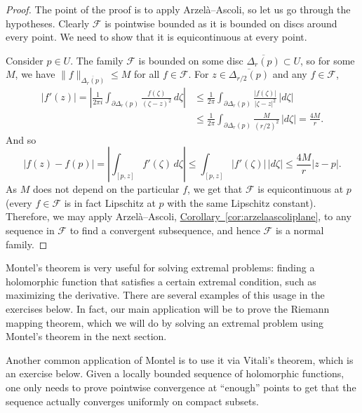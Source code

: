 \documentclass[12pt,openany]{book}
\newcommand{\sabs}[1]{\lvert {#1} \rvert}
\newcommand{\snorm}[1]{\lVert {#1} \rVert}
\newcommand{\abs}[1]{\left\lvert {#1} \right\rvert}
\newcommand{\sF}{{\mathscr{F}}}
\newcommand{\myquote}[1]{``#1''}
\theoremstyle{plain}
\theoremstyle{remark}
\theoremstyle{definition}
\theoremstyle{exercise}
\theoremstyle{example}
\newcommand{\corref}[1]{\hyperref[#1]{Corollary~\ref*{#1}}}
\begin{document}
\begin{proof}
The point of the proof is to apply Arzel\`a--Ascoli, so let us go through
the hypotheses.
Clearly $\sF$ is pointwise bounded as it is bounded on discs around
every point.
We need to show that it is equicontinuous at every point.

Consider $p \in U$.
The family
$\sF$ is bounded on some disc $\overline{\Delta_r(p)} \subset U$,
so for some $M$, we have
$\snorm{f}_{\overline{\Delta_r(p)}} \leq M$ for all $f \in \sF$.
For $z \in \overline{\Delta_{r/2}(p)}$ and any $f \in \sF$,
\begin{equation*}
\begin{split}
\abs{f'(z)}
=
\abs{
\frac{1}{2\pi i}
\int_{\partial \Delta_r(p)}
\frac{f(\zeta)}{{(\zeta-z)}^2} \, d\zeta
}
& \leq
\frac{1}{2\pi}
\int_{\partial \Delta_r(p)}
\frac{\sabs{f(\zeta)}}{\sabs{\zeta-z}^2} \, \sabs{d\zeta}
\\
& \leq
\frac{1}{2\pi}
\int_{\partial \Delta_r(p)}
\frac{M}{{(r/2)}^2} \, \sabs{d\zeta}
=
\frac{4 M}{r}.
\end{split}
\end{equation*}
And so
\begin{equation*}
\abs{f(z)-f(p)}
=
\abs{
\int_{[p,z]} f'(\zeta) \, d\zeta
}
\leq
\int_{[p,z]} \abs{f'(\zeta)} \, \sabs{d\zeta}
\leq
\frac{4 M}{r} \sabs{z-p} .
\end{equation*}
As $M$ does not depend on the particular $f$, we get that $\sF$ is
equicontinuous at $p$ (every $f \in \sF$ is in fact Lipschitz at $p$ with the same
Lipschitz constant).
Therefore, we may apply Arzel\`a--Ascoli, 
\corref{cor:arzelaascoliplane}, to any sequence in $\sF$
to find a convergent subsequence, and hence $\sF$ is a normal family.
\end{proof}

Montel's theorem is very useful for solving extremal problems: 
finding a holomorphic function that satisfies a certain extremal condition,
such as maximizing the derivative.  There are several examples of this
usage in the exercises below.  In fact, our main application will be to
prove the Riemann mapping theorem,
which we will do by solving an extremal
problem using Montel's theorem in the next section.

Another common application of Montel is to use it via Vitali's theorem, which is
an exercise below.  Given a locally bounded sequence of holomorphic
functions, one only needs to prove pointwise convergence at \myquote{enough}
points to get that the sequence actually converges uniformly on compact subsets.
\end{document}

